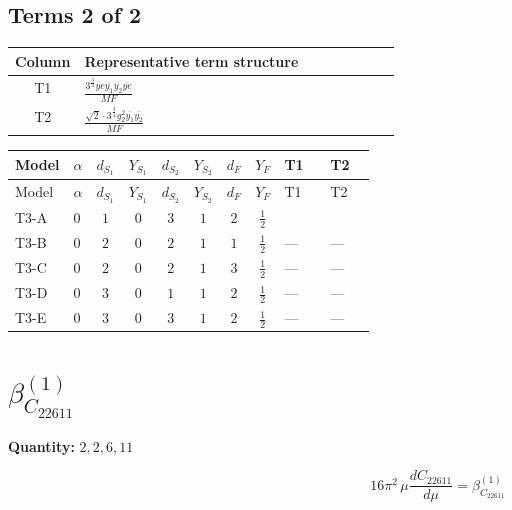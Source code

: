 \documentclass[8pt]{article}
\begin{document}
\begin{landscape}
\subsection*{Terms 2 of 2}
\begin{center}
\begin{tabular}{@{}c >{\raggedright\arraybackslash}p{0.82\linewidth}@{}}
\toprule
Column & Representative term structure \\
\midrule
T1 & \(\displaystyle \frac{3^{\frac{3}{4}} ye \overline{y_{1}} \overline{y_{2}} \overline{ye}}{MF}\) \\
\midrule
T2 & \(\displaystyle \frac{\sqrt{2} \cdot 3^{\frac{3}{4}} g_{2}^{2} \overline{y_{1}} \overline{y_{2}}}{MF}\) \\
\midrule
\bottomrule
\end{tabular}
\end{center}
\smallskip
\tiny
\begin{longtable}{@{}llcccccc >{\raggedright\arraybackslash}p{0.21\linewidth} >{\raggedright\arraybackslash}p{0.21\linewidth}@{}}
\toprule
Model & $\alpha$ & $d_{S_1}$ & $Y_{S_1}$ & $d_{S_2}$ & $Y_{S_2}$ & $d_F$ & $Y_F$ & T1 & T2 \\
\midrule
\endfirsthead
\toprule
Model & $\alpha$ & $d_{S_1}$ & $Y_{S_1}$ & $d_{S_2}$ & $Y_{S_2}$ & $d_F$ & $Y_F$ & T1 & T2 \\
\midrule
\endhead
T3-A & $0$ & $1$ & $0$ & $3$ & $1$ & $2$ & $\frac{1}{2}$ & \scriptsize\adjustbox{max width=\linewidth}{$\begin{gathered} - \frac{3^{\frac{3}{4}} ye \overline{y_{1}} \overline{y_{2}} \overline{ye}}{12 MF}\end{gathered}$} & \scriptsize\adjustbox{max width=\linewidth}{$\begin{gathered} \frac{\sqrt{2} \cdot 3^{\frac{3}{4}} g_{2}^{2} \overline{y_{1}} \overline{y_{2}}}{3 MF}\end{gathered}$} \\
\midrule
T3-B & $0$ & $2$ & $0$ & $2$ & $1$ & $1$ & $\frac{1}{2}$ & --- & --- \\
\midrule
T3-C & $0$ & $2$ & $0$ & $2$ & $1$ & $3$ & $\frac{1}{2}$ & --- & --- \\
\midrule
T3-D & $0$ & $3$ & $0$ & $1$ & $1$ & $2$ & $\frac{1}{2}$ & --- & --- \\
\midrule
T3-E & $0$ & $3$ & $0$ & $3$ & $1$ & $2$ & $\frac{1}{2}$ & --- & --- \\
\midrule
\bottomrule
\end{longtable}
\clearpage
\section*{$\beta_{C_{22611}}^{(1)}$}
\noindent\textbf{Quantity: }$\mathrm{2,2,6,11}$\par\smallskip
\[16\pi^2\,\mu\frac{d C_{22611}}{d\mu}=\beta_{C_{22611}}^{(1)}\]

\end{landscape}
\end{document}
